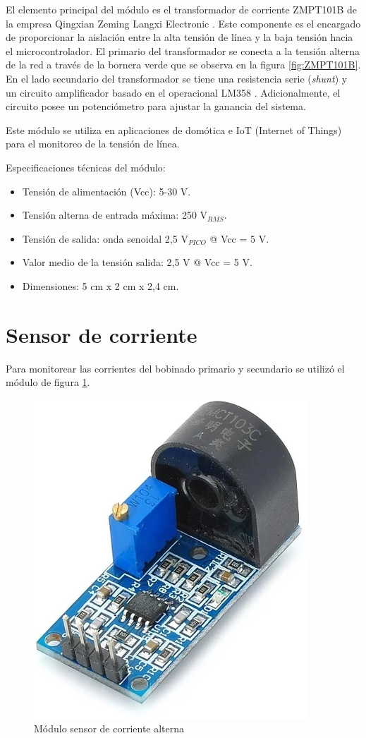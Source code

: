 El elemento principal del módulo es el transformador de corriente ZMPT101B de la empresa Qingxian Zeming Langxi Electronic \citep{ZMPT101B_b}. Este componente es el encargado de proporcionar la aislación entre la alta tensión de línea y la baja tensión hacia el microcontrolador. El primario del transformador se conecta a la tensión alterna de la red a través de la bornera verde que se observa en la figura \ref{fig:ZMPT101B}. En el lado secundario del transformador se tiene una resistencia serie (\textit{shunt}) y un circuito amplificador basado en el operacional LM358 \citep{LM358}. Adicionalmente, el circuito posee un potenciómetro para ajustar la ganancia del sistema.

Este módulo se utiliza en aplicaciones de domótica e IoT (Internet of Things) para el monitoreo de la tensión de línea.

Especificaciones técnicas del módulo: 
\begin{itemize}
\item Tensión de alimentación (Vcc): 5-30 V.
\item Tensión alterna de entrada máxima: 250 V$_{RMS}$.
\item Tensión de salida: onda senoidal 2,5 V$_{PICO}$ @ Vcc = 5 V.
\item Valor medio de la tensión salida: 2,5 V @ Vcc = 5 V.
\item Dimensiones: 5 cm x 2 cm x 2,4 cm.
\end{itemize}

\section{Sensor de corriente}
\label{sec:secZMCT103C}

Para monitorear las corrientes del bobinado primario y secundario se utilizó el módulo de figura \ref{fig:ZMCT103C}.

\begin{figure}[htpb]
	\centering
	\includegraphics[scale=.6]{./Figures/ZMCT103C.png}
	\caption{Módulo sensor de corriente alterna}
	\label{fig:ZMCT103C}
\end{figure}

